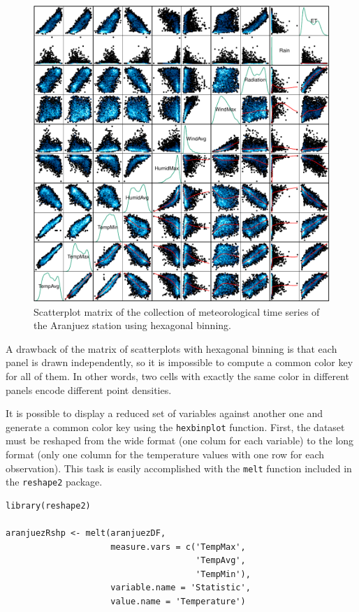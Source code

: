 \begin{figure}[htbp]
\centering
\includegraphics[width=.9\linewidth]{figs/aranjuezSplomHexbin.pdf}
\caption{Scatterplot matrix of the collection of meteorological time series of the Aranjuez station using hexagonal binning. \label{fig:aranjuezSplomHexbin}}
\end{figure}

A drawback of the matrix of scatterplots with hexagonal binning is
that each panel is drawn independently, so it is impossible to compute
a common color key for all of them. In other words, two cells with
exactly the same color in different panels encode different point
densities.

It is possible to display a reduced set of variables against another
one and generate a common color key using the \texttt{hexbinplot}
function. First, the dataset must be reshaped from the wide format
(one colum for each variable) to the long format (only one column for
the temperature values with one row for each observation). This task
is easily accomplished with the \texttt{melt} function included in the
\texttt{reshape2} package.


\lstset{language=r,label= ,caption= ,captionpos=b,numbers=none}
\begin{lstlisting}
library(reshape2)

aranjuezRshp <- melt(aranjuezDF,
                     measure.vars = c('TempMax',
                                      'TempAvg',
                                      'TempMin'),
                     variable.name = 'Statistic',
                     value.name = 'Temperature')
\end{lstlisting}


